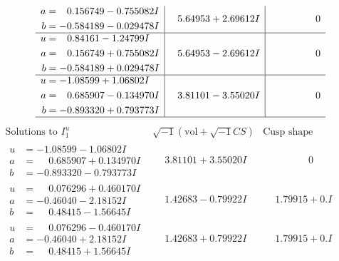 \documentclass[1p]{elsarticle_modified}
\theoremstyle{definition}
\newcommand{\I}{\sqrt{-1}}
\begin{document}
$$\begin{array}{c|c|c}
\begin{aligned}
a &= \phantom{-}0.156749 - 0.755082 I \\
b &= -0.584189 - 0.029478 I\end{aligned}
 & \phantom{-}5.64953 + 2.69612 I & \phantom{-0.000000 } 0 \\ \hline\begin{aligned}
u &= \phantom{-}0.84161 - 1.24799 I \\
a &= \phantom{-}0.156749 + 0.755082 I \\
b &= -0.584189 + 0.029478 I\end{aligned}
 & \phantom{-}5.64953 - 2.69612 I & \phantom{-0.000000 } 0 \\ \hline\begin{aligned}
u &= -1.08599 + 1.06802 I \\
a &= \phantom{-}0.685907 - 0.134970 I \\
b &= -0.893320 + 0.793773 I\end{aligned}
 & \phantom{-}3.81101 - 3.55020 I & \phantom{-0.000000 } 0\\
 \hline 
 \end{array}$$\newpage$$\begin{array}{c|c|c}  
\text{Solutions to }I^u_{1}& \I (\text{vol} + \sqrt{-1}CS) & \text{Cusp shape}\\
 \hline 
\begin{aligned}
u &= -1.08599 - 1.06802 I \\
a &= \phantom{-}0.685907 + 0.134970 I \\
b &= -0.893320 - 0.793773 I\end{aligned}
 & \phantom{-}3.81101 + 3.55020 I & \phantom{-0.000000 } 0 \\ \hline\begin{aligned}
u &= \phantom{-}0.076296 + 0.460170 I \\
a &= -0.46040 - 2.18152 I \\
b &= \phantom{-}0.48415 - 1.56645 I\end{aligned}
 & \phantom{-}1.42683 - 0.79922 I & \phantom{-}1.79915 + 0. I\phantom{ +0.000000I} \\ \hline\begin{aligned}
u &= \phantom{-}0.076296 - 0.460170 I \\
a &= -0.46040 + 2.18152 I \\
b &= \phantom{-}0.48415 + 1.56645 I\end{aligned}
 & \phantom{-}1.42683 + 0.79922 I & \phantom{-}1.79915 + 0. I\phantom{ +0.000000I} \\ \hline\begin{aligned}

\end{aligned}
\end{array}$$
\end{document}
